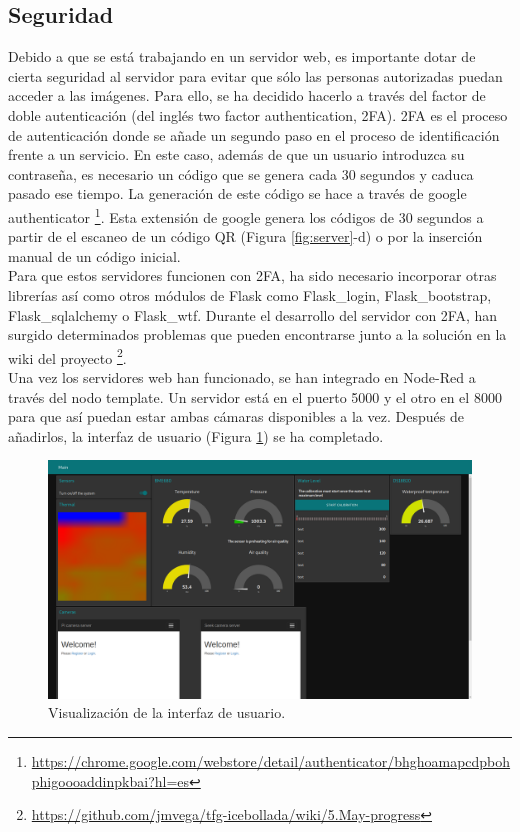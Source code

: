 \subsection{Seguridad}
Debido a que se está trabajando en un servidor web, es importante dotar de cierta seguridad al servidor para evitar que sólo las personas autorizadas puedan acceder a las imágenes. Para ello, se ha decidido hacerlo a través del factor de doble autenticación (del inglés two factor authentication, 2FA). 2FA es el proceso de autenticación donde se añade un segundo paso en el proceso de identificación frente a un servicio. En este caso, además de que un usuario introduzca su contraseña, es necesario un código que se genera cada 30 segundos y caduca pasado ese tiempo. La generación de este código se hace a través de google authenticator \footnote{\url{https://chrome.google.com/webstore/detail/authenticator/bhghoamapcdpbohphigoooaddinpkbai?hl=es}}. Esta extensión de google genera los códigos de 30 segundos a partir de el escaneo de un código QR (Figura \ref{fig:server}-d) o por la inserción manual de un código inicial.\\

Para que estos servidores funcionen con 2FA, ha sido necesario incorporar otras librerías así como otros módulos de Flask como Flask\_login, Flask\_bootstrap, Flask\_sqlalchemy o Flask\_wtf. Durante el desarrollo del servidor con 2FA, han surgido determinados problemas que pueden encontrarse junto a la solución en la wiki del proyecto \footnote{\url{https://github.com/jmvega/tfg-icebollada/wiki/5.May-progress}}.\\

Una vez los servidores web han funcionado, se han integrado en Node-Red a través del nodo template. Un servidor está en el puerto 5000 y el otro en el 8000 para que así puedan estar ambas cámaras disponibles a la vez. Después de añadirlos, la interfaz de usuario (Figura \ref{fig:UIcompleta}) se ha completado.\\
\begin{figure} [h!]
  \begin{center}
    \includegraphics[width=16cm]{figs/UIcompleta}
  \end{center}
  \caption{Visualización de la interfaz de usuario.}
  \label{fig:UIcompleta}
\end{figure}

